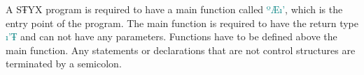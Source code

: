 A SŦYX program is required to have a main function called \textcolor{teal}{ºÆı’}, which is the entry point of the program.
The main function is required to have the return type \textcolor{teal}{ı’Ŧ} and can not have any parameters.
Functions have to be defined above the main function. Any statements
or declarations that are not control structures are terminated by a semicolon.